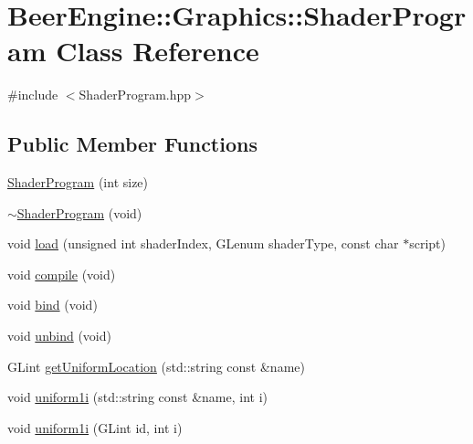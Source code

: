 \hypertarget{class_beer_engine_1_1_graphics_1_1_shader_program}{}\section{Beer\+Engine\+:\+:Graphics\+:\+:Shader\+Program Class Reference}
\label{class_beer_engine_1_1_graphics_1_1_shader_program}


{\ttfamily \#include $<$Shader\+Program.\+hpp$>$}

\subsection*{Public Member Functions}
\begin{DoxyCompactItemize}
\item 
\mbox{\hyperlink{class_beer_engine_1_1_graphics_1_1_shader_program_aee2fd393bbe665f1d6d1d4389242490e}{Shader\+Program}} (int size)
\item 
\mbox{\hyperlink{class_beer_engine_1_1_graphics_1_1_shader_program_adce6fa1e441965862456330f4f3f4de4}{$\sim$\+Shader\+Program}} (void)
\item 
void \mbox{\hyperlink{class_beer_engine_1_1_graphics_1_1_shader_program_ac205d24d3c80e87fed7010acbcb40b33}{load}} (unsigned int shader\+Index, G\+Lenum shader\+Type, const char $\ast$script)
\item 
void \mbox{\hyperlink{class_beer_engine_1_1_graphics_1_1_shader_program_a060e889dea04cc9cb1f746dc1d8ca5b5}{compile}} (void)
\item 
void \mbox{\hyperlink{class_beer_engine_1_1_graphics_1_1_shader_program_afa6beb6d744fa6eae87e41958042aabb}{bind}} (void)
\item 
void \mbox{\hyperlink{class_beer_engine_1_1_graphics_1_1_shader_program_a280b1136661844c2af0bde2ad09f6200}{unbind}} (void)
\item 
G\+Lint \mbox{\hyperlink{class_beer_engine_1_1_graphics_1_1_shader_program_a9a42d998117a60631e154a3791acf802}{get\+Uniform\+Location}} (std\+::string const \&name)
\item 
void \mbox{\hyperlink{class_beer_engine_1_1_graphics_1_1_shader_program_a37a1f053ac9ab67c44063027cc327733}{uniform1i}} (std\+::string const \&name, int i)
\item 
void \mbox{\hyperlink{class_beer_engine_1_1_graphics_1_1_shader_program_a4acc44ee9ecdcc65ba1fef542846ca9d}{uniform1i}} (G\+Lint id, int i)
\item 

\end{DoxyCompactItemize}
